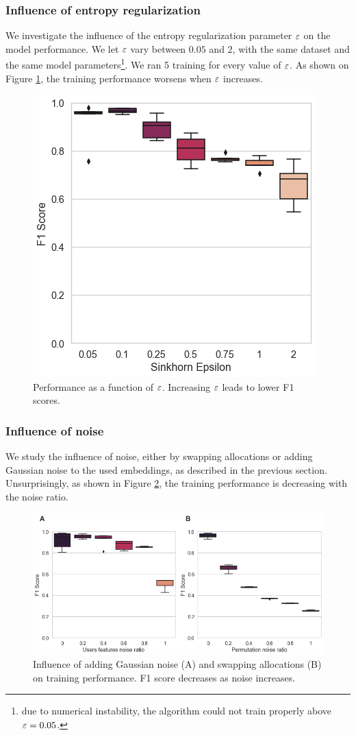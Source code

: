 \subsubsection*{Influence of entropy regularization}
We investigate the influence of the entropy regularization parameter $\varepsilon$ on the model performance. We let $\varepsilon$ vary between $0.05$ and $2$, with the same dataset and the same model parameters\footnote{due to numerical instability, the algorithm could not train properly above $\varepsilon = 0.05$.}. We ran 5 training for every value of $\varepsilon$. As shown on Figure \ref{fig:experiment_epsilon}, the training performance worsens when $\varepsilon$ increases.

\begin{figure}[h]
    \centering
    \includegraphics[width=.45\columnwidth]{images/simca/experiment_epsilon_boxplot.png}
    \caption{
        Performance as a function of $\varepsilon$. Increasing $\varepsilon$ leads to lower F1 scores.
    }
    \label{fig:experiment_epsilon}
\end{figure}

\subsubsection*{Influence of noise}
We study the influence of noise, either by swapping allocations or adding Gaussian noise to the used embeddings, as described in the previous section. Unsurprisingly, as shown in Figure \ref{fig:experiment_noise}, the training performance is decreasing with the noise ratio.

\begin{figure}[h]
    \centering
    \includegraphics[width=.9\columnwidth]{images/simca/experiment_noise_boxplot.png}
    \caption{
        Influence of adding Gaussian noise (A) and swapping allocations (B) on training performance. F1 score decreases as noise increases.
    }
    \label{fig:experiment_noise}
\end{figure}

